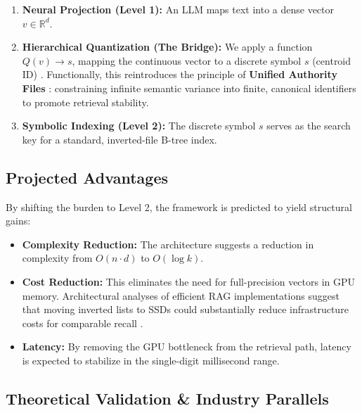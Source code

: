 \documentclass[manuscript,screen,nonacm]{acmart}
\begin{document}
\begin{enumerate}
    \item \textbf{Neural Projection (Level 1):} An LLM maps text into a dense vector $v \in \mathbb{R}^d$.
    \item \textbf{Hierarchical Quantization (The Bridge):} We apply a function $Q(v) \rightarrow s$, mapping the continuous vector to a discrete symbol $s$ (centroid ID) \cite{zandieh2025}. Functionally, this reintroduces the principle of \textbf{Unified Authority Files} \cite{caprazli2003}: constraining infinite semantic variance into finite, canonical identifiers to promote retrieval stability.
    \item \textbf{Symbolic Indexing (Level 2):} The discrete symbol $s$ serves as the search key for a standard, inverted-file B-tree index.
\end{enumerate}

\subsection{Projected Advantages}

By shifting the burden to Level 2, the framework is predicted to yield structural gains:
\begin{itemize}
    \item \textbf{Complexity Reduction:} The architecture suggests a reduction in complexity from $O(n \cdot d)$ to $O(\log k)$.
    \item \textbf{Cost Reduction:} This eliminates the need for full-precision vectors in GPU memory. Architectural analyses of efficient RAG implementations suggest that moving inverted lists to SSDs could substantially reduce infrastructure costs for comparable recall \cite{vectordb2024}.
    \item \textbf{Latency:} By removing the GPU bottleneck from the retrieval path, latency is expected to stabilize in the single-digit millisecond range.
\end{itemize}

\subsection{Theoretical Validation \& Industry Parallels}
\end{document}
